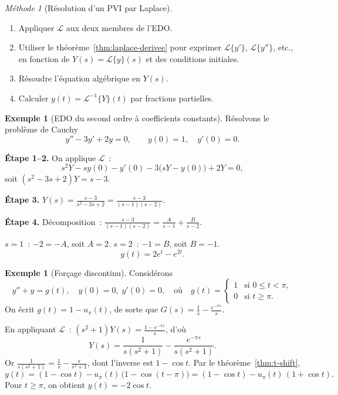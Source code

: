 \documentclass[12pt,a4paper,openany]{book}
\theoremstyle{definition}
\newtheorem{exemple}[definition]{Exemple}
\theoremstyle{plain}
\theoremstyle{remark}
\newtheorem{methode}[definition]{Méthode}
\begin{document}
\begin{methode}[Résolution d'un PVI par Laplace]\label{meth:resolution-laplace}
  \begin{enumerate}[label=\textbf{Étape \arabic*.}]
    \item Appliquer $\mathcal{L}$ aux deux membres de l'EDO.
    \item Utiliser le théorème~\ref{thm:laplace-derivee} pour exprimer
      $\mathcal{L}\{y'\}$, $\mathcal{L}\{y''\}$, etc., en fonction de
      $Y(s)=\mathcal{L}\{y\}(s)$ et des conditions initiales.
    \item Résoudre l'équation algébrique en $Y(s)$.
    \item Calculer $y(t)=\mathcal{L}^{-1}\{Y\}(t)$ par fractions
      partielles.
  \end{enumerate}
\end{methode}

\begin{exemple}[EDO du second ordre à coefficients constants]\label{ex:laplace-edo2}
  Résolvons le problème de Cauchy
  \[
    y''-3y'+2y=0, \qquad y(0)=1,\quad y'(0)=0.
  \]

  \textbf{Étape 1--2.} On applique $\mathcal{L}$~:
  \[
    s^2Y-sy(0)-y'(0)-3\bigl(sY-y(0)\bigr)+2Y=0,
  \]
  soit $(s^2-3s+2)Y=s-3$.

  \textbf{Étape 3.}
  $\displaystyle Y(s)=\frac{s-3}{s^2-3s+2}=\frac{s-3}{(s-1)(s-2)}$.

  \textbf{Étape 4.} Décomposition~:
  $\frac{s-3}{(s-1)(s-2)}=\frac{A}{s-1}+\frac{B}{s-2}$.

  $s=1$~: $-2=-A$, soit $A=2$. \quad $s=2$~: $-1=B$, soit $B=-1$.
  \[
    y(t)=2e^{t}-e^{2t}.
  \]
\end{exemple}

\begin{exemple}[Forçage discontinu]\label{ex:laplace-discontinu}
  Considérons
  \[
    y''+y = g(t), \quad y(0)=0,\; y'(0)=0,
    \quad\text{où}\quad
    g(t)=\begin{cases}1&\text{si } 0\leq t<\pi,\\0&\text{si } t\geq\pi.\end{cases}
  \]
  On écrit $g(t)=1-u_\pi(t)$, de sorte que
  $G(s)=\frac{1}{s}-\frac{e^{-\pi s}}{s}$.

  En appliquant $\mathcal{L}$~:
  $(s^2+1)Y(s)=\frac{1-e^{-\pi s}}{s}$, d'où
  \[
    Y(s)=\frac{1}{s(s^2+1)}-\frac{e^{-\pi s}}{s(s^2+1)}.
  \]
  Or $\frac{1}{s(s^2+1)}=\frac{1}{s}-\frac{s}{s^2+1}$, dont
  l'inverse est $1-\cos t$. Par le théorème~\ref{thm:t-shift},
  \[
    y(t) = (1-\cos t) - u_\pi(t)\,\bigl(1-\cos(t-\pi)\bigr)
         = (1-\cos t) - u_\pi(t)\,(1+\cos t).
  \]
  Pour $t\geq\pi$, on obtient $y(t)=-2\cos t$.
\end{exemple}
\end{document}
